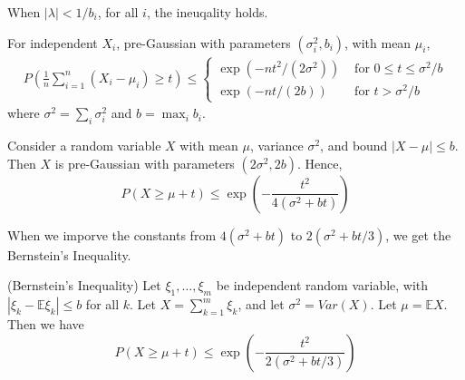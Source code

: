When $\left| \lambda \right| < 1/b_i$, for all $i$, the ineuqality holds.

\begin{corollary} \cite*{Bartlett:2020}
  For independent $X_i$, pre-Gaussian with parameters $(\sigma_{i}^2 , b_i)$, with mean $\mu_i$,
  \begin{equation}
    \begin{array}{l}
    P\left(\frac{1}{n} \sum_{i=1}^{n}\left(X_{i}-\mu_{i}\right) \geq t\right) \leq\left\{\begin{array}{ll}
    \exp \left(-n t^{2} /\left(2 \sigma^{2}\right)\right) & \text { for } 0 \leq t \leq \sigma^{2} / b \\
    \exp (-n t /(2 b)) & \text { for } t>\sigma^{2} / b
    \end{array}\right. 
    
    \end{array}
    \end{equation}
    where $\sigma^{2}=\sum_{i} \sigma_{i}^{2}$ and $b=\max _{i} b_{i}$.
\end{corollary} 


Consider a random variable $X$ with mean $\mu$, variance $\sigma^2$, and bound $\left| X-\mu \right| \leq b$.
Then $X$ is pre-Gaussian with parameters $(2\sigma^2 , 2b)$. Hence,
\begin{equation}
  P(X \geq \mu+t) \leq \exp \left(-\frac{t^{2}}{4\left(\sigma^{2}+b t\right)}\right)
\end{equation}

When we imporve the constants from $4\left(\sigma^{2}+b t\right)$ to $2(\sigma^2 + bt/3)$, we get the Bernstein's Inequality.

\begin{theorem} (Bernstein's Inequality)\cite*{Kutin:2002}
  Let $\xi_{1}, \dots, \xi_{m}$ be independent random variable, with $\left| \xi_k - \mathbb{E}\xi_k \right| \leq b$ for all $k$. 
  Let $X = \sum_{k=1}^{m} \xi_k$, and let $\sigma^2 = Var(X)$.
  Let $\mu = \mathbb{E}X$. Then we have
  \begin{equation}
    P(X \geq \mu+t) \leq \exp \left(-\frac{t^{2}}{2(\sigma^2 + bt/3)}\right)
  \end{equation}  
\end{theorem}

